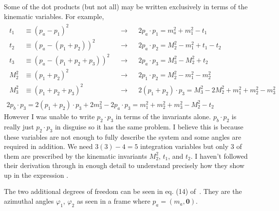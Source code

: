 Some of the dot products (but not all) may be written exclusively in terms of the kinematic variables. For example,
\begin{gather*}
    \begin{align*}
        t_1 &\equiv (p_a - p_1)^2 &&\rightarrow 
        && 2 p_a \cdot p_1 = m_a^2 +  m_1^2 - t_1 \\
        t_2 &\equiv (p_a - (p_1 + p_2))^2 &&\rightarrow 
        && 2 p_a \cdot p_2 = M_2^2 - m_1^2 + t_1 - t_2 \\
        t_3 &\equiv (p_a - (p_1 + p_2 + p_3))^2 &&\rightarrow 
        && 2 p_a \cdot p_3 = M_3^2 - M_2^2 + t_2 \\
        M_2^2 &\equiv (p_1 + p_2)^2 &&\rightarrow 
        && 2 p_1 \cdot p_2 = M_2^2 - m_1^2 - m_2^2 \\
        M_3^2 &\equiv (p_1 + p_2 + p_3)^2 &&\rightarrow 
        && 2 (p_1 + p_2) \cdot p_3 = M_3^2 - 2 M_2^2 + m_1^2 + m_2^2 - m_3^2 
    \end{align*}\\
    2 p_b \cdot p_3 = 2 (p_1 + p_2) \cdot p_3 + 2 m_3^2  - 2 p_a \cdot p_3 =
    m_1^2 + m_2^2 + m_3^2 - M_2^2 - t_2
\end{gather*}
However I was unable to write $p_2 \cdot p_3$ in terms of the invariants alone. 
$p_b \cdot p_2$ is really just $p_2 \cdot p_3$ in disguise so it has the same problem.
I believe this is because these variables are not enough to fully describe the system and some angles are required in addition. 
We need $3(3) - 4 = 5$ integration variables but only $3$ of them are prescribed by the kinematic invariants $M_2^2$, $t_1$, and $t_2$\footnotemark.
I haven't followed their derivation through in enough detail to understand precisely how they show up in the expression 
.

The two additional degrees of freedom can be seen in eq. (14) of~\cite{Byckling:1969sx}. 
They are the azimuthal angles $\varphi_1$, $\varphi_2$ as seen in a frame where $p_a = (m_a, \bm{0})$.   

